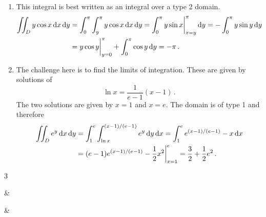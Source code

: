 \begin{solution}
\begin{enumerate}
\item
This integral is best written as an integral over a type 2 domain.
\begin{align*}
\iint_D y \cos x \,\mathrm{d} x \,\mathrm{d} y
&= \int_0^\pi \int_y^\pi y \cos x \,\mathrm{d} x \,\mathrm{d} y
= \int_0^\pi y \sin x \bigg|_{x=y}^\pi \,\mathrm{d} y
= - \int_0^\pi y \sin y \,\mathrm{d} y \\
&= y \cos y \bigg|_{y=0}^\pi + \int_0^\pi \cos y \,\mathrm{d} y
= -\pi\,.
\end{align*}
\item
The challenge here is to find the limits of integration. These are given by solutions of
\[
\ln x = \frac {1}{e-1} \left(x-1\right)\,.
\]
The two solutions are given by $x=1$ and $x=e$. The domain is of type 1 and therefore
\begin{align*}
\iint_D e^y \,\mathrm{d} x \,\mathrm{d} y
&= \int_1^e \int_{\ln x}^{(x-1)/(e-1)} e^y \,\mathrm{d} y \,\mathrm{d} x
= \int_1^e e^{(x-1)/(e-1)} - x \,\mathrm{d} x \\
&= (e-1) e^{(x-1)/(e-1)} - \frac 12 x^2 \bigg|_{x=1}^e
= \frac 32 + \frac 12 e^2\,.
\end{align*}
\end{enumerate}
\begin{center}
\begin{figuretable}{3}
&
&
\end{figuretable}
\end{center}
\end{solution}
